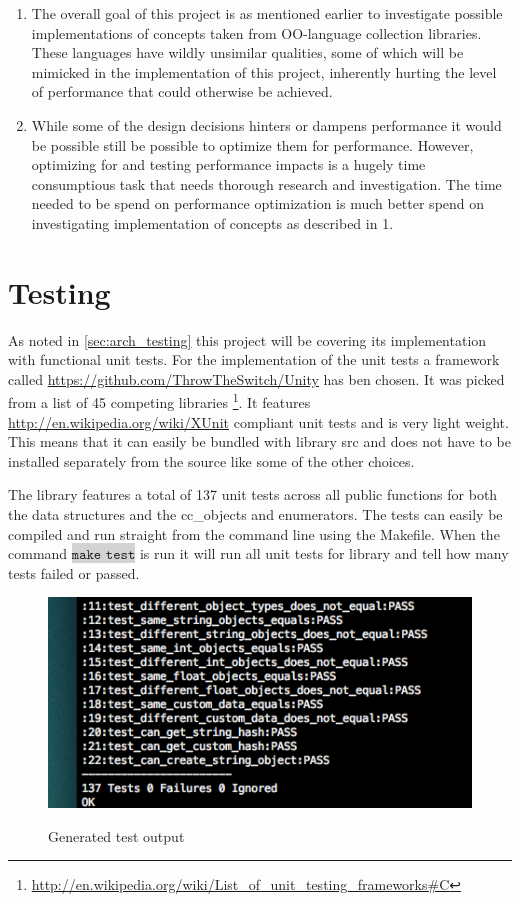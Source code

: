 \documentclass[table]{ituthesis}
\newcommand{\highlight}[1]{\colorbox{lightGray}{$\displaystyle \texttt{#1}$}}
\begin{document}
\begin{enumerate}
	\item The overall goal of this project is as mentioned earlier to investigate possible implementations of concepts taken from OO-language collection libraries. These languages have wildly unsimilar qualities, some of which will be mimicked in the implementation of this project, inherently hurting the level of performance that could otherwise be achieved.
	\item While some of the design decisions hinters or dampens performance it would be possible still be possible to optimize them for performance. However, optimizing for and testing performance impacts is a hugely time consumptious task that needs thorough research and investigation. The time needed to be spend on performance optimization is much better spend on investigating implementation of concepts as described in 1.
\end{enumerate}

\section{Testing}

	As noted in \autoref{sec:arch_testing} this project will be covering its implementation with functional unit tests. For the implementation of the unit tests a framework called \href{Unity}{https://github.com/ThrowTheSwitch/Unity} has ben chosen. It was picked from a list of 45 competing libraries \footnote{\href{http://en.wikipedia.org/wiki/List\_of\_unit\_testing\_frameworks\#C}{http://en.wikipedia.org/wiki/List\_of\_unit\_testing\_frameworks\#C}}. It features \href{xUnit}{http://en.wikipedia.org/wiki/XUnit} compliant unit tests and is very light weight. This means that it can easily be bundled with library src and does not have to be installed separately from the source like some of the other choices.

	The library features a total of 137 unit tests across all public functions for both the data structures and the cc\_objects and enumerators. The tests can easily be compiled and run straight from the command line using the Makefile. When the command \highlight{make test} is run it will run all unit tests for library and tell how many tests failed or passed.
	
	\begin{figure}[ht!]
		\includegraphics{images/test_output.png}
		\label{fig:generate_test_output}
		\caption{Generated test output}
	\end{figure}
	
\end{document}

